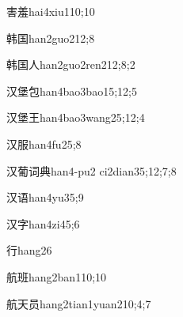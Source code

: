 \begin{verbete}{害羞}{hai4xiu1}{10;10}
\end{verbete}

\begin{verbete}{韩国}{han2guo2}{12;8}
\end{verbete}

\begin{verbete}{韩国人}{han2guo2ren2}{12;8;2}
\end{verbete}

\begin{verbete}{汉堡包}{han4bao3bao1}{5;12;5}
\end{verbete}

\begin{verbete}{汉堡王}{han4bao3wang2}{5;12;4}
\end{verbete}

\begin{verbete}{汉服}{han4fu2}{5;8}
\end{verbete}

\begin{verbete}{汉葡词典}{han4-pu2 ci2dian3}{5;12;7;8}
\end{verbete}

\begin{verbete}{汉语}{han4yu3}{5;9}
\end{verbete}

\begin{verbete}{汉字}{han4zi4}{5;6}
\end{verbete}

\begin{verbete}{行}{hang2}{6}
\end{verbete}

\begin{verbete}{航班}{hang2ban1}{10;10}
\end{verbete}

\begin{verbete}{航天员}{hang2tian1yuan2}{10;4;7}
\end{verbete}

